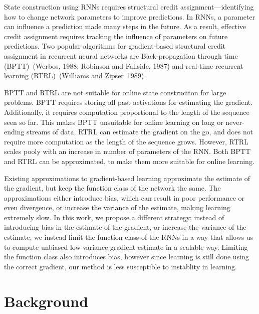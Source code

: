 \documentclass[twoside,11pt]{article}
\begin{document}
State construction using RNNs requires structural credit assignment---identifying how to change network parameters to improve predictions. In RNNs, a parameter can influence  a prediction made many steps in the future. As a result, effective credit assignment requires tracking the influence of parameters on future predictions. Two popular algorithms for gradient-based structural credit assignment in recurrent neural networks are Back-propagation through time (BPTT)~(Werbos, 1988; Robinson and Fallside, 1987)  and real-time recurrent learning (RTRL)~(Williams and Zipser~1989). 

BPTT and RTRL are not suitable for online state construciton for large problems. BPTT requires storing all past activations for estimating the gradient. Additionally, it requires computation proportional to the length of the sequence seen so far. This makes BPTT unsuitable for online learning on long or never-ending streams of data. RTRL can estimate the gradient on the go, and does not require more computation as the length of the sequence grows. However, RTRL scales pooly with an increase in number of parameters of the RNN. Both BPTT and RTRL can be approximated, to make them more suitable for online learning. 

Existing approximations to gradient-based learning approximate the estimate of the gradient, but keep the function class of the network the same. The approximations either introduce bias, which can result in poor performance or even divergence, or increase the variance of the estimate, making learning extremely slow. In this work, we propose a different strategy; instead of introducing bias in the estimate of the gradient, or increase the variance of the estimate, we instead limit the function class of the RNNs in a way that allows us to compute unbiased low-variance gradient estimate in a scalable way. Limiting the function class also introduces bias, however since learning is still done using the correct gradient, our method is less susceptible to instablity in learning. 




\section{Background}
\end{document}
